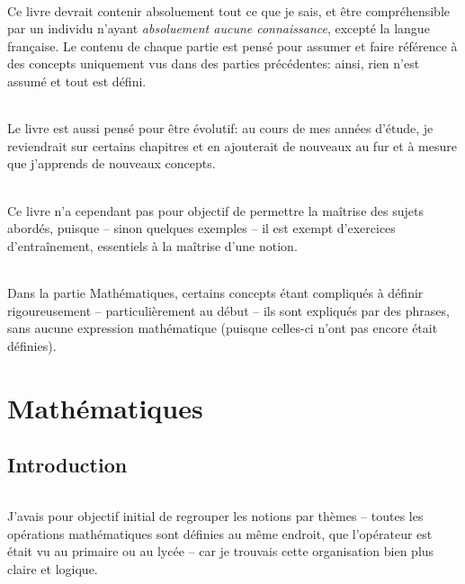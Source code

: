 \documentclass[a4paper]{book}
\begin{document}
    \paragraph{}
    Ce livre devrait contenir absoluement tout ce que je sais, et être compréhensible par un individu n'ayant \emph{absoluement aucune connaissance}, excepté la langue française. Le contenu de chaque partie est pensé pour assumer et faire référence à des concepts uniquement vus dans des parties précédentes: ainsi, rien n'est assumé et tout est défini.
    \paragraph{}
    Le livre est aussi pensé pour être évolutif: au cours de mes années d'étude, je reviendrait sur certains chapitres et en ajouterait de nouveaux au fur et à mesure que j'apprends de nouveaux concepts.
    \paragraph{}
    Ce livre n'a cependant pas pour objectif de permettre la maîtrise des sujets abordés, puisque -- sinon quelques exemples -- il est exempt d'exercices d'entraînement, essentiels à la maîtrise d'une notion.
    \paragraph{}
    Dans la partie Mathématiques, certains concepts étant compliqués à définir rigoureusement -- particulièrement au début -- ils sont expliqués par des phrases, sans aucune expression mathématique (puisque celles-ci n'ont pas encore était définies).
 
    \mainmatter
 
    \part{Mathématiques}
    \chapter*{Introduction}
    \paragraph{}
    J'avais pour objectif initial de regrouper les notions par thèmes -- toutes les opérations mathématiques sont définies au même endroit, que l'opérateur est était vu au primaire ou au lycée -- car je trouvais cette organisation bien plus claire et logique.
\end{document}
